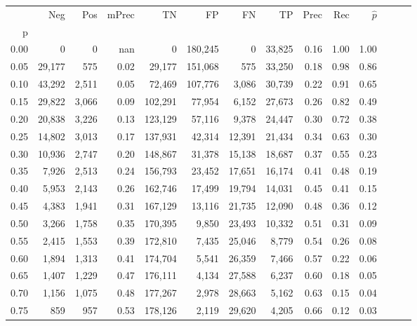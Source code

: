 \begin{tabular}{rrrrrrrrrrrrrr}
\toprule
{} &     Neg &    Pos & mPrec &       TN &       FP &      FN &      TP &  Prec &   Rec & $\hat{p}$ \\
p    &         &        &       &          &          &         &         &       &       &           \\
\midrule
0.00 &       0 &      0 &   nan &        0 &  180,245 &       0 &  33,825 &  0.16 &  1.00 &      1.00 \\
0.05 &  29,177 &    575 &  0.02 &   29,177 &  151,068 &     575 &  33,250 &  0.18 &  0.98 &      0.86 \\
0.10 &  43,292 &  2,511 &  0.05 &   72,469 &  107,776 &   3,086 &  30,739 &  0.22 &  0.91 &      0.65 \\
0.15 &  29,822 &  3,066 &  0.09 &  102,291 &   77,954 &   6,152 &  27,673 &  0.26 &  0.82 &      0.49 \\
0.20 &  20,838 &  3,226 &  0.13 &  123,129 &   57,116 &   9,378 &  24,447 &  0.30 &  0.72 &      0.38 \\
0.25 &  14,802 &  3,013 &  0.17 &  137,931 &   42,314 &  12,391 &  21,434 &  0.34 &  0.63 &      0.30 \\
0.30 &  10,936 &  2,747 &  0.20 &  148,867 &   31,378 &  15,138 &  18,687 &  0.37 &  0.55 &      0.23 \\
0.35 &   7,926 &  2,513 &  0.24 &  156,793 &   23,452 &  17,651 &  16,174 &  0.41 &  0.48 &      0.19 \\
0.40 &   5,953 &  2,143 &  0.26 &  162,746 &   17,499 &  19,794 &  14,031 &  0.45 &  0.41 &      0.15 \\
0.45 &   4,383 &  1,941 &  0.31 &  167,129 &   13,116 &  21,735 &  12,090 &  0.48 &  0.36 &      0.12 \\
0.50 &   3,266 &  1,758 &  0.35 &  170,395 &    9,850 &  23,493 &  10,332 &  0.51 &  0.31 &      0.09 \\
0.55 &   2,415 &  1,553 &  0.39 &  172,810 &    7,435 &  25,046 &   8,779 &  0.54 &  0.26 &      0.08 \\
0.60 &   1,894 &  1,313 &  0.41 &  174,704 &    5,541 &  26,359 &   7,466 &  0.57 &  0.22 &      0.06 \\
0.65 &   1,407 &  1,229 &  0.47 &  176,111 &    4,134 &  27,588 &   6,237 &  0.60 &  0.18 &      0.05 \\
0.70 &   1,156 &  1,075 &  0.48 &  177,267 &    2,978 &  28,663 &   5,162 &  0.63 &  0.15 &      0.04 \\
0.75 &     859 &    957 &  0.53 &  178,126 &    2,119 &  29,620 &   4,205 &  0.66 &  0.12 &      0.03 \\

\end{tabular}
